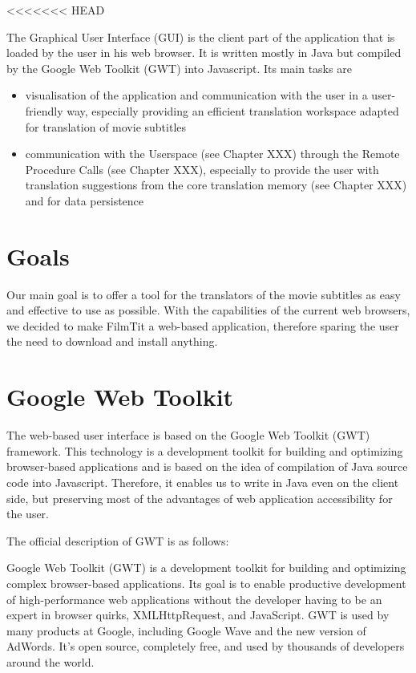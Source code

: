 <<<<<<< HEAD

The Graphical User Interface (GUI) is the client part of the application that is loaded by the user in his web browser. It is written mostly in Java but compiled by the Google Web Toolkit (GWT) into Javascript. Its main tasks are

\begin{itemize}
\item visualisation of the application and communication with the user in a user-friendly way, especially providing an efficient translation workspace adapted for translation of movie subtitles
\item communication with the Userspace (see Chapter XXX) through the Remote Procedure Calls (see Chapter XXX), especially to provide the user with translation suggestions from the core translation memory (see Chapter XXX) and for data persistence
\end{itemize}

\section{Goals}
Our main goal is to offer a tool for the translators of the movie subtitles as easy and effective to use as possible. With the capabilities of the current web browsers, we decided to make FilmTit a web-based application, therefore sparing the user the need to download and install anything.

\section{Google Web Toolkit}
The web-based user interface is based on the Google Web Toolkit (GWT) framework. This technology is a development toolkit for building and optimizing browser-based applications %
and is based on the idea of compilation of Java source code into Javascript. Therefore, it enables us to write in Java even on the client side, but preserving most of the advantages of web application accessibility for the user.

The official description of GWT is as follows:


Google Web Toolkit (GWT) is a development toolkit for building and optimizing complex browser-based applications. Its goal is to enable productive development of high-performance web applications without the developer having to be an expert in browser quirks, XMLHttpRequest, and JavaScript. GWT is used by many products at Google, including Google Wave and the new version of AdWords. It's open source, completely free, and used by thousands of developers around the world.

